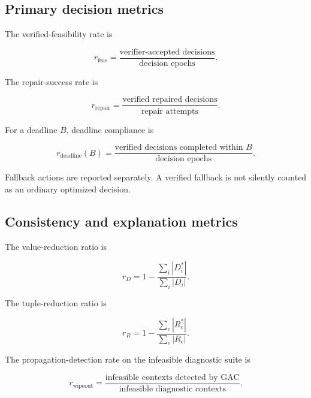 \documentclass[pdflatex,sn-mathphys-num,iicol,oneside]{sn-jnl}
\begin{document}
\subsection{Primary decision metrics}

The verified-feasibility rate is

\begin{equation}
r_{\mathrm{feas}}
=
\frac{
\text{verifier-accepted decisions}
}{
\text{decision epochs}
}.
\end{equation}

The repair-success rate is

\begin{equation}
r_{\mathrm{repair}}
=
\frac{
\text{verified repaired decisions}
}{
\text{repair attempts}
}.
\end{equation}

For a deadline $B$, deadline compliance is

\begin{equation}
r_{\mathrm{deadline}}(B)
=
\frac{
\text{verified decisions completed within }B
}{
\text{decision epochs}
}.
\end{equation}

Fallback actions are reported separately. A verified fallback is not
silently counted as an ordinary optimized decision.

\subsection{Consistency and explanation metrics}

The value-reduction ratio is

\begin{equation}
r_D
=
1-
\frac{
\sum_i |D_i^{*}|
}{
\sum_i |D_i|
}.
\label{eq:value-reduction}
\end{equation}

The tuple-reduction ratio is

\begin{equation}
r_R
=
1-
\frac{
\sum_c |R_c^{*}|
}{
\sum_c |R_c|}
.
\label{eq:tuple-reduction}
\end{equation}

The propagation-detection rate on the infeasible diagnostic suite is

\begin{equation}
r_{\mathrm{wipeout}}
=
\frac{
\text{infeasible contexts detected by GAC}
}{
\text{infeasible diagnostic contexts}
}.
\end{equation}
\end{document}
